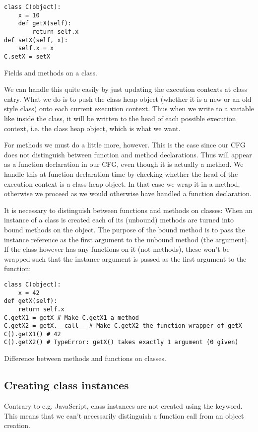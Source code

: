\begin{listing}[H]
	\begin{verbatim}
class C(object):
	x = 10
	def getX(self):
		return self.x
def setX(self, x):
	self.x = x
C.setX = setX
	\end{verbatim}
	\caption{Fields and methods on a class.}\label{code:FieldAndMethodOnClass}
\end{listing}

We can handle this quite easily by just updating the execution contexts at class entry. What we do is to push the class heap object (whether it is a new or an old style class) onto each current execution context. Thus when we write to a variable like  inside the class, it will be written to the head of each possible execution context, i.e. the class heap object, which is what we want.

For methods we must do a little more, however. This is the case since our CFG does not distinguish between function and method declarations. Thus  will appear as a function declaration in our CFG, even though it is actually a method. We handle this at function declaration time by checking whether the head of the execution context is a class heap object. In that case we wrap it in a method, otherwise we proceed as we would otherwise have handled a function declaration.

It is necessary to distinguish between functions and methods on classes: When an instance of a class is created each of its (unbound) methods are turned into bound methods on the object. The purpose of the bound method is to pass the instance reference as the first argument to the unbound method (the  argument). If the class however has any functions on it (not methods), these won't be wrapped such that the instance argument is passed as the first argument to the function:

\begin{listing}[H]
	\begin{verbatim}
class C(object):
	x = 42
def getX(self):
	return self.x
C.getX1 = getX # Make C.getX1 a method
C.getX2 = getX.__call__ # Make C.getX2 the function wrapper of getX
C().getX1() # 42
C().getX2() # TypeError: getX() takes exactly 1 argument (0 given)
	\end{verbatim}
	\caption{Difference between methods and functions on classes.}\label{code:FieldAndMethodOnClass}
\end{listing}


\subsection{Creating class instances}
Contrary to e.g. JavaScript, class instances are not created using the  keyword. This means that we can't necessarily distinguish a function call from an object creation.

